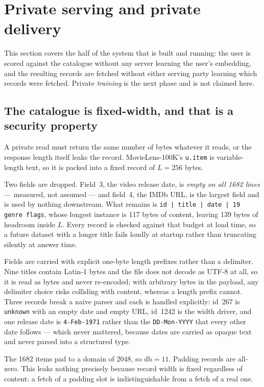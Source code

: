 \section{Private serving and private delivery}
\label{sec:tech:pir}

This section covers the half of the system that is built and running: the user
is scored against the catalogue without any server learning the user's
embedding, and the resulting records are fetched without either serving party
learning which records were fetched. Private \emph{training} is the next phase
and is not claimed here.

\subsection{The catalogue is fixed-width, and that is a security property}
\label{sec:tech:pir:catalogue}

A private read must return the same number of bytes whatever it reads, or the
response length itself leaks the record. MovieLens-100K's \texttt{u.item} is
variable-length text, so it is packed into a fixed record of $L = 256$ bytes.

Two fields are dropped. Field~3, the video release date, is \emph{empty on all
1682 lines} --- measured, not assumed --- and field~4, the IMDb URL, is the
largest field and is used by nothing downstream. What remains is
\texttt{id\,|\,title\,|\,date\,|\,19 genre flags}, whose longest instance is
117 bytes of content, leaving 139 bytes of headroom inside $L$. Every record is
checked against that budget at load time, so a future dataset with a longer
title fails loudly at startup rather than truncating silently at answer time.

Fields are carried with explicit one-byte length prefixes rather than a
delimiter. Nine titles contain Latin-1 bytes and the file does not decode as
UTF-8 at all, so it is read as bytes and never re-encoded; with arbitrary bytes
in the payload, any delimiter choice risks colliding with content, whereas a
length prefix cannot. Three records break a naive parser and each is handled
explicitly: id~267 is \texttt{unknown} with an empty date and empty URL,
id~1242 is the width driver, and one release date is \texttt{4-Feb-1971} rather
than the \texttt{DD-Mon-YYYY} that every other date follows --- which never
mattered, because dates are carried as opaque text and never parsed into a
structured type.

The 1682 items pad to a domain of $2048$, so $\mathrm{db} = 11$. Padding
records are all-zero. This leaks nothing precisely because record width is
fixed regardless of content: a fetch of a padding slot is indistinguishable
from a fetch of a real one.

